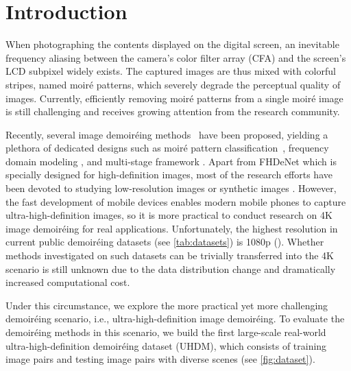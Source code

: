 \documentclass[runningheads]{llncs}
\newcommand{\ie}{i.e.}
\begin{document}
\section{Introduction}
\label{sec:intro}

When photographing the contents displayed on the digital screen, an inevitable frequency aliasing between the camera's color filter array (CFA) and the screen's LCD subpixel widely exists. The captured images are thus mixed with colorful stripes, named moiré patterns, which severely degrade the perceptual quality of images. Currently, efficiently removing moiré patterns from a single moiré image is still challenging and receives growing attention from the research community.  

Recently, several image demoiréing methods~\cite{he2020fhde,zheng2020image,he2019mop,sun2018moire,liu2020wavelet,cheng2019multi,liu2018demoir,yuan2019aim} have been proposed, yielding a plethora of dedicated designs such as moiré pattern classification~\cite{he2019mop}, frequency domain modeling \cite{liu2020wavelet,zheng2020image}, and multi-stage framework \cite{he2020fhde}. Apart from FHDeNet \cite{he2020fhde} which is specially designed for high-definition images, most of the research efforts have been devoted to studying low-resolution images \cite{sun2018moire} or synthetic images \cite{yuan2019aim}.
However, the fast development of mobile devices enables modern mobile phones to capture ultra-high-definition images, so it is more practical to conduct research on 4K image demoiréing for real applications. Unfortunately, the highest resolution in current public demoiréing datasets (see \cref{tab:datasets}) is 1080p \cite{he2020fhde} (). Whether methods investigated on such datasets can be trivially transferred into the 4K scenario is still unknown due to the data distribution change and dramatically increased computational cost. 

Under this circumstance, we explore the more practical yet more challenging demoiréing scenario, \ie, ultra-high-definition image demoiréing.  To evaluate the demoiréing methods in this scenario, we build the first large-scale real-world ultra-high-definition demoiréing dataset (UHDM), which consists of  training image pairs and  testing image pairs with diverse scenes (see \cref{fig:dataset}). 
\end{document}

